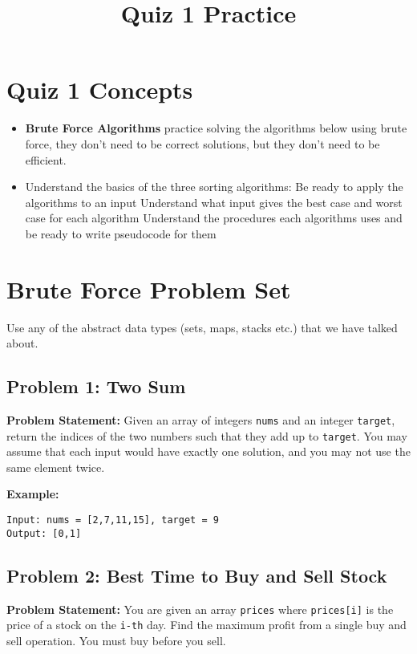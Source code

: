 \documentclass[12pt]{article}
\title{Quiz 1 Practice}
\date{}
\begin{document}
\section*{Quiz 1 Concepts}
\begin{itemize}
  \item \textbf{Brute Force Algorithms} practice solving the algorithms below using brute force, they don't need to be correct solutions, but they don't need to be efficient.
  \item Understand the basics of the three sorting algorithms:\newline
Be ready to apply the algorithms to an input\newline
Understand what input gives the best case and worst case for each algorithm\newline
Understand the procedures each algorithms uses and be ready to write pseudocode for them
\end{itemize}

\section*{Brute Force Problem Set}
Use any of the abstract data types (sets, maps, stacks etc.) that we have talked about.
\subsection*{Problem 1: Two Sum}
\textbf{Problem Statement:} Given an array of integers \texttt{nums} and an integer \texttt{target}, return the indices of the two numbers such that they add up to \texttt{target}. You may assume that each input would have exactly one solution, and you may not use the same element twice.

\textbf{Example:}
\begin{verbatim}
Input: nums = [2,7,11,15], target = 9
Output: [0,1]
\end{verbatim}


\vspace{1cm}

\subsection*{Problem 2: Best Time to Buy and Sell Stock}
\textbf{Problem Statement:} You are given an array \texttt{prices} where \texttt{prices[i]} is the price of a stock on the \texttt{i-th} day. Find the maximum profit from a single buy and sell operation. You must buy before you sell.
\end{document}
